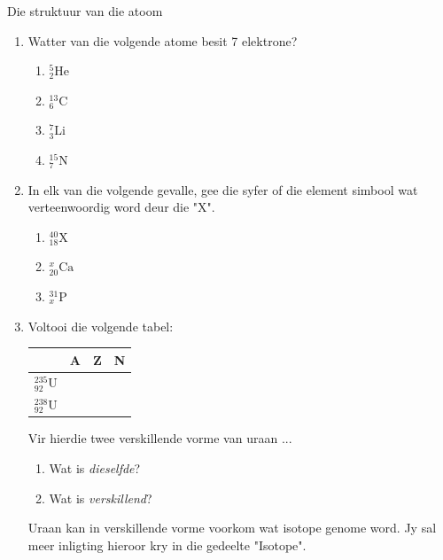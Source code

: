 \begin{exercises}{Die struktuur van die atoom}
\begin{enumerate}[noitemsep, label=\textbf{\arabic*}. ]
\begin{enumerate}[noitemsep, label=\textbf{\alph*}. ]
\end{enumerate}
... in die atoom.\newline
\item Watter van die volgende atome besit 7 elektrone?
\begin{enumerate}[noitemsep, label=\textbf{\alph*}. ] 
            \item $_{2}^{5}\text{He}$
\item $_{6}^{13}\text{C}$
\item $_{3}^{7}\text{Li}$
\item $_{7}^{15}\text{N}$
\end{enumerate}
                \item 
In elk van die volgende gevalle, gee die syfer of die element simbool wat verteenwoordig word deur die "X".
\begin{enumerate}[noitemsep, label=\textbf{\alph*}. ] 
            \item $_{18}^{40}\text{X}$
\item $_{20}^{x}\text{Ca}$
\item $_{x}^{31}\text{P}$
\end{enumerate}
                \item 
Voltooi die volgende tabel:
          \begin{table}[H]
        \begin{center}
      
    \noindent
      \begin{tabular}{|l|l|l|l|}\hline
         &
        \textbf{A} &
        \textbf{Z} &
        \textbf{N} \\ \hline
        $_{92}^{235}\text{U}$ &
         &
         &
        \\ \hline
        $_{92}^{238}\text{U}$ &
         &
         &
     \\ \hline
    \end{tabular}
      \end{center}
\end{table}
    \par
Vir hierdie twee verskillende vorme van uraan ...
\begin{enumerate}[noitemsep, label=\textbf{\alph*}. ] 
            \item Wat is \textsl{dieselfde}?
\item Wat is \textsl{verskillend}?
\end{enumerate}
Uraan kan in verskillende vorme voorkom wat isotope genome word. Jy sal meer inligting hieroor kry in die gedeelte "Isotope".\newline
\end{enumerate}
  

\end{exercises}
